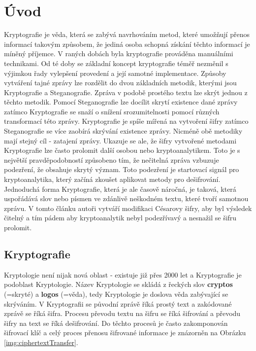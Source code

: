 \documentclass[12pt,a4paper]{article}
\let\oldsection\section
\renewcommand\section{\clearpage\oldsection}
\begin{document}
\section{Úvod}
Kryptografie je věda, která se zabývá navrhováním metod, které umožňují přenos informací takovým způsobem, že jediná osoba schopná získání těchto informací je míněný příjemce.
V raných dobách byla kryptografie prováděna manuálními technikami. Od té doby se základní koncept kryptografie téměř nezměnil s výjimkou řady vylepšení provedení a její samotné implementace. \newline
Způsoby vytváření tajné zprávy lze rozdělit do dvou základních metodik, kterými jsou Kryptografie a Steganografie. Zpráva v podobě prostého textu lze skrýt jednou z těchto metodik. Pomocí Steganografie lze docílit skrytí existence dané zprávy zatímco Kryptografie se snaží o snížení srozumitelnosti pomocí různých transformací této zprávy.\newline
Kryptografie je spíše mířená na vytvoření šifry zatímco Steganografie se více zaobírá skrývání existence zprávy. Nicméně obě metodiky mají stejný cíl - zatajení zprávy. Ukazuje se ale, že šifry vytvořené metodami Kryptografie lze často prolomit další osobou nebo kryptoanalytikem. Toto je s největší pravděpodobností způsobeno tím, že nečitelná zpráva vzbuzuje podezření, že obsahuje skrytý význam. Toto podezření je startovací signál pro kryptoanalytika, který začíná zkoušet aplikovat metody pro dešifrování. Jednoduchá forma Kryptografie, která je ale časově náročná, je taková, která uspořádává slov nebo písmen ve zdánlivě neškodném textu, které tvoří samotnou zprávu. V tomto článku autoři vytváří modifikaci Césarovy šifry, aby byl výsledek čitelný a tím pádem aby kryptoanalytik nebyl podezřívavý a nesnažil se šifru prolomit\cite{purnama93}.
\subsection{Kryptografie}
Kryptologie není nijak nová oblast - existuje již přes 2000 let a Kryptografie je podoblast Kryptologie. Název Kryptologie se skládá z řeckých slov \textbf{cryptos} (=skryté) a \textbf{logos} (=věda), tedy Kryptologie je doslova věda zabývající se skrýváním.
V Kryptografii se původní zprávě říká prostý text a zakódované zprávě se říká šifra. Procesu převodu textu na šifru se říká šifrování a převodu šifry na text se říká dešifrování. Do těchto procesů je často zakomponován šifrovací klíč a celý proces přenosu šifrované informace je znázorněn na Obrázku \ref{img:ciphertextTransfer}.\cite{kiwi16}
\end{document}
